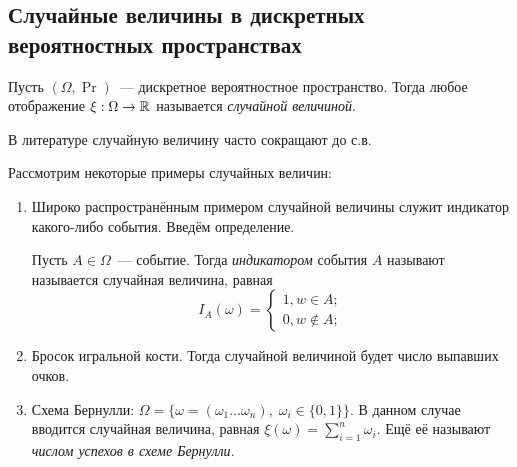 \subsection{Случайные величины в дискретных вероятностных пространствах}
\begin{definition}
    Пусть \((\Omega, \Pr)\)~--- дискретное вероятностное пространство. Тогда любое отображение \(\xi : \Omega \to \mathbb{R}\) называется \emph{случайной величиной}.
\end{definition}
\begin{remark}
    В литературе случайную величину часто сокращают до с.в.
\end{remark}
Рассмотрим некоторые примеры случайных величин:
\begin{enumerate}
    \item Широко распространённым примером случайной величины служит индикатор какого-либо события. Введём определение.
    \begin{definition}
        Пусть \(A \in \Omega\)~--- событие. Тогда \emph{индикатором} события \(A\) называют называется случайная величина, равная \[I_A(\omega) = \begin{cases}
        1, w \in A; \\
        0, w \not\in A;
        \end{cases}\]
    \end{definition}
    
    \item Бросок игральной кости. Тогда случайной величиной будет число выпавших очков.
    
    \item Схема Бернулли: \(\Omega = \{\omega = (\omega_1 \ldots \omega_n),\; \omega_i \in \{0, 1\} \}\). В данном случае вводится случайная величина, равная \(\xi(\omega) = \sum\limits_{i=1}^{n}\omega_i\). Ещё её называют \emph{числом успехов в схеме Бернулли}.
\end{enumerate}
